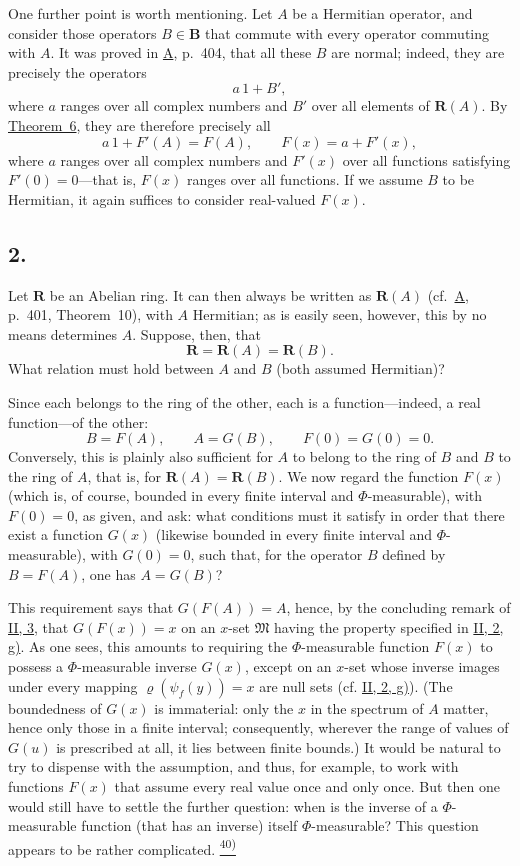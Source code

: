 \documentclass[12pt,b5paper,twoside]{article}
\newcommand{\noteref}[1]{%
  \hyperlink{note:#1}{\textsuperscript{#1)}}}
\begin{document}
One further point is worth mentioning.  Let \(A\) be a Hermitian operator,
and consider those operators \(B\in \mathbf B\) that commute with every
operator commuting with \(A\).  It was proved in \hyperref[ref:A]{A},
p.~404, that all these \(B\) are normal; indeed, they are precisely the
operators
\[
 a\,1+B',
\]
where \(a\) ranges over all complex numbers and \(B'\) over all elements
of $\mathbf R(A)$.  By \hyperref[thm:6]{Theorem~6}, they are therefore precisely all
\[
  a\,1+F'(A)=F(A), \qquad F(x)=a+F'(x),
\]
where $a$ ranges over all complex numbers and $F'(x)$ over all functions satisfying
$F'(0)=0$---that is, $F(x)$ ranges over all functions.  If we assume $B$ to be
Hermitian, it again suffices to consider real-valued $F(x)$.

\subsection*{2.}
\label{sec:III.2}
Let $\mathbf R$ be an Abelian ring.  It can then always be written as
$\mathbf R(A)$ (cf.\ \hyperref[ref:A]{A}, p.~401, Theorem~10), with $A$ Hermitian; as is easily
seen, however, this by no means determines $A$.  Suppose, then, that
\[
  \mathbf R=\mathbf R(A)=\mathbf R(B).
\]
What relation must hold between $A$ and $B$ (both assumed Hermitian)?

Since each belongs to the ring of the other, each is a function---indeed, a real
function---of the other:
\[
  B=F(A), \qquad A=G(B), \qquad F(0)=G(0)=0.
\]
Conversely, this is plainly also sufficient for $A$ to belong to the ring of $B$ and
$B$ to the ring of $A$, that is, for $\mathbf R(A)=\mathbf R(B)$.  We now
regard the function $F(x)$ (which is, of course, bounded in every finite interval and
$\Phi$-measurable), with $F(0)=0$, as given, and ask: what conditions must it satisfy
in order that there exist a function $G(x)$ (likewise bounded in every finite interval
and $\Phi$-measurable), with $G(0)=0$, such that, for the operator $B$ defined by
$B=F(A)$, one has $A=G(B)$?

This requirement says that $G(F(A))=A$, hence, by the concluding remark of
\hyperref[sec:II.3]{II, 3}, that $G(F(x))=x$ on an $x$-set $\mathfrak{M}$ having the
property specified in \hyperref[sec:II.2]{II, 2, g)}.  As one sees, this amounts to
requiring the $\Phi$-measurable function $F(x)$ to possess a $\Phi$-measurable inverse
$G(x)$, except on an $x$-set whose inverse images under every mapping
$\varrho(\psi_f(y))=x$ are null sets (cf. \hyperref[sec:II.2]{II, 2, g)}).  (The
boundedness of $G(x)$ is immaterial: only the $x$ in the spectrum of $A$ matter, hence
only those in a finite interval; consequently, wherever the range of values of $G(u)$
is prescribed at all, it lies between finite bounds.)  It would be natural to try to
dispense with the assumption, and thus, for example, to work with functions $F(x)$
that assume every real value once and only once.  But then one would still have to
settle the further question: when is the inverse of a $\Phi$-measurable function (that
has an inverse) itself $\Phi$-measurable?  This question appears to be rather
complicated.\noteref{40}
\end{document}
